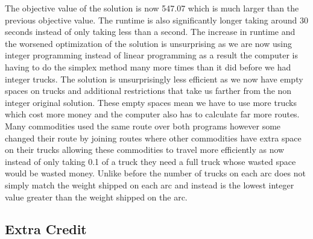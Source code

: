 \documentclass[
]{article}
\begin{document}
The objective value of the solution is now 547.07 which is much larger
than the previous objective value. The runtime is also significantly
longer taking around 30 seconds instead of only taking less than a
second. The increase in runtime and the worsened optimization of the
solution is unsurprising as we are now using integer programming instead
of linear programming as a result the computer is having to do the
simplex method many more times than it did before we had integer trucks.
The solution is unsurprisingly less efficient as we now have empty
spaces on trucks and additional restrictions that take us farther from
the non integer original solution. These empty spaces mean we have to
use more trucks which cost more money and the computer also has to
calculate far more routes. Many commodities used the same route over
both programs however some changed their route by joining routes where
other commodities have extra space on their trucks allowing these
commodities to travel more efficiently as now instead of only taking 0.1
of a truck they need a full truck whose wasted space would be wasted
money. Unlike before the number of trucks on each arc does not simply
match the weight shipped on each arc and instead is the lowest integer
value greater than the weight shipped on the arc.

\hypertarget{extra-credit}{%
\subsection{Extra Credit}\label{extra-credit}}
\end{document}
